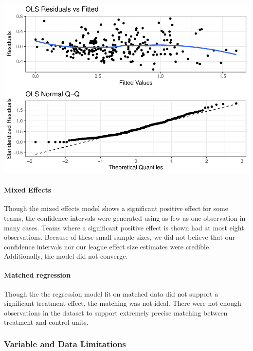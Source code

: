 \documentclass[12pt]{article}
\begin{document}
\includegraphics{journal-article_files/figure-latex/ols-limitation-plots-1.pdf}

\hypertarget{mixed-effects}{%
\paragraph{Mixed Effects}\label{mixed-effects}}

Though the mixed effects model shows a significant positive effect for
some teams, the confidence intervals were generated using as few as one
observation in many cases. Teams where a significant positive effect is
shown had at most eight observations. Because of these small sample
sizes, we did not believe that our confidence intervals nor our league
effect size estimates were credible. Additionally, the model did not
converge.

\hypertarget{matched-regression}{%
\paragraph{Matched regression}\label{matched-regression}}

Though the the regression model fit on matched data did not support a
significant treatment effect, the matching was not ideal. There were not
enough observations in the dataset to support extremely precise matching
between treatment and control units.

\hypertarget{variable-and-data-limitations}{%
\subsubsection{Variable and Data
Limitations}\label{variable-and-data-limitations}}
\end{document}
